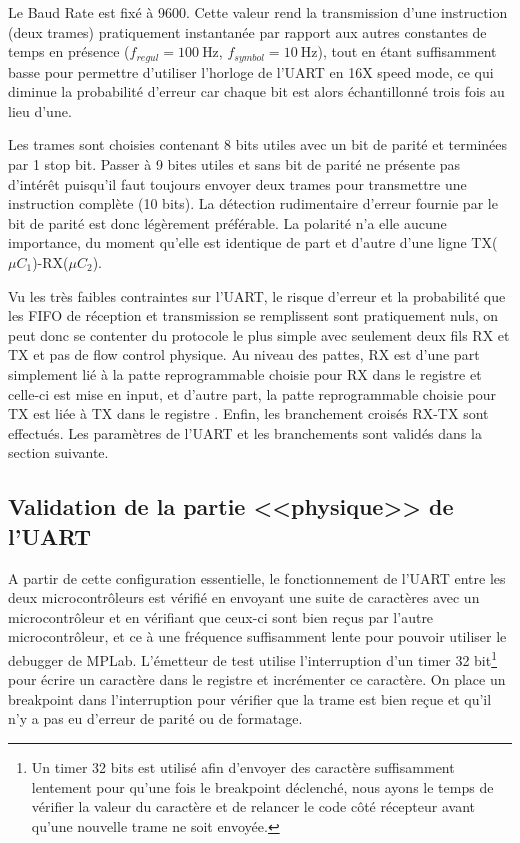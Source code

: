 Le Baud Rate est fixé à \num{9600}. Cette valeur rend la transmission d'une instruction (deux trames) pratiquement instantanée par rapport aux autres constantes de temps en présence ($f_{regul} = \SI{100}{\hertz}$, $f_{symbol} = \SI{10}{\hertz}$), tout en étant suffisamment basse pour permettre d'utiliser l'horloge de l'UART en 16X speed mode, ce qui diminue la probabilité d'erreur car chaque bit est alors échantillonné trois fois au lieu d'une.

Les trames sont choisies contenant 8 bits utiles avec un bit de parité et terminées par 1 stop bit. Passer à 9 bites utiles et sans bit de parité ne présente pas d'intérêt puisqu'il faut toujours envoyer deux trames pour transmettre une instruction complète (10 bits). La détection rudimentaire d'erreur fournie par le bit de parité est donc légèrement préférable. La polarité n'a elle aucune importance, du moment qu'elle est identique de part et d'autre d'une ligne TX($\mu C_1$)-RX($\mu C_2$).

Vu les très faibles contraintes sur l'UART, le risque d'erreur et la probabilité que les FIFO de réception et transmission se remplissent sont pratiquement nuls, on peut donc se contenter du protocole le plus simple avec seulement deux fils RX et TX et pas de flow control physique. Au niveau des pattes, RX est d'une part simplement lié à la patte reprogrammable choisie pour RX dans le registre  et celle-ci est mise en input, et d'autre part, la patte reprogrammable choisie pour TX est liée à TX dans le registre . Enfin, les branchement croisés RX-TX sont effectués. Les paramètres de l'UART et les branchements sont validés dans la section suivante.

\subsection{Validation de la partie <<physique>> de l'UART\label{sec:validUart}}
A partir de cette configuration essentielle, le fonctionnement de l'UART entre les deux microcontrôleurs est vérifié en envoyant une suite de caractères avec un microcontrôleur et en vérifiant que ceux-ci sont bien reçus par l'autre microcontrôleur, et ce à une fréquence suffisamment lente pour pouvoir utiliser le debugger de MPLab. L'émetteur de test utilise l'interruption d'un timer 32 bit\footnote{Un timer 32 bits est utilisé afin d'envoyer des caractère suffisamment lentement pour qu'une fois le breakpoint déclenché, nous ayons le temps de vérifier la valeur du caractère et de relancer le code côté récepteur avant qu'une nouvelle trame ne soit envoyée.} pour écrire un caractère dans le registre  et incrémenter ce caractère. On place un breakpoint dans l'interruption  pour vérifier que la trame est bien reçue et qu'il n'y a pas eu d'erreur de parité ou de formatage.

